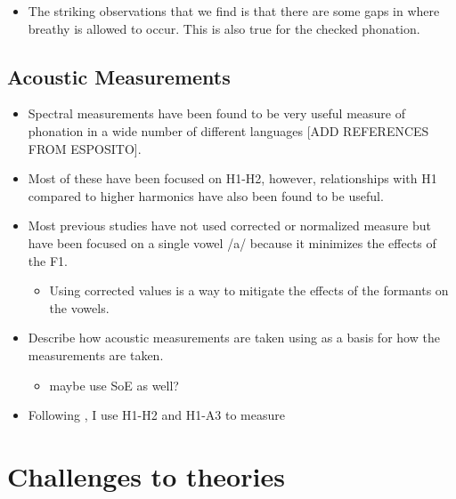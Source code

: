 \documentclass[12pt, letterpaper]{article}
\begin{document}
\begin{itemize}
	\item The striking observations that we find is that there are some gaps in where breathy is allowed to occur. This is also true for the checked phonation. 
\end{itemize}
\subsection{Acoustic Measurements} \label{sec:Acoustics}

\begin{itemize}
	\item Spectral measurements have been found to be very useful measure of phonation in a wide number of different languages [ADD REFERENCES FROM ESPOSITO]. 
	\item Most of these have been focused on H1-H2, however, relationships with H1 compared to higher harmonics have also been found to be useful. 
	\item Most previous studies have not used corrected or normalized measure but have been focused on a single vowel /a/ because it minimizes the effects of the F1.
	\begin{itemize}
		\item Using corrected values is a way to mitigate the effects of the formants on the vowels. 
	\end{itemize}
	\item Describe how acoustic measurements are taken using \citet{garellekPhoneticsVoice2019} as a basis for how the measurements are taken. 
	\begin{itemize}
		\item maybe use SoE as well?
	\end{itemize}
	\item Following \citet{espositoVariationContrastivePhonation2010}, I use H1-H2 and H1-A3 to measure 
\end{itemize}


\section{Challenges to theories} \label{sec:Challenges}
\end{document}
